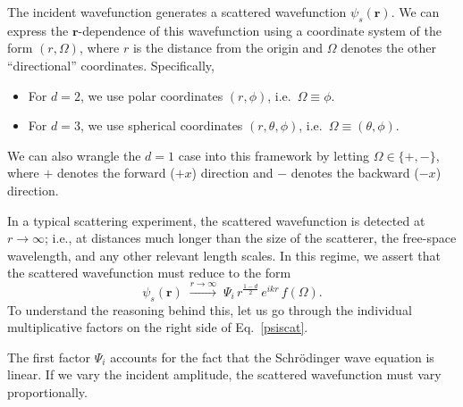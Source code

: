 \documentclass[prx,12pt]{revtex4-2}
\begin{document}
The incident wavefunction generates a scattered wavefunction
$\psi_s(\mathbf{r})$.  We can express the $\mathbf{r}$-dependence of
this wavefunction using a coordinate system of the form $(r,\Omega)$,
where $r$ is the distance from the origin and $\Omega$ denotes the
other ``directional'' coordinates.  Specifically,
\begin{itemize}
\item For $d = 2$, we use polar coordinates $(r,\phi)$, i.e.~$\Omega
  \equiv \phi$.

\item For $d = 3$, we use spherical coordinates $(r, \theta, \phi)$,
  i.e.~$\Omega \equiv (\theta,\phi)$.
\end{itemize}
We can also wrangle the $d = 1$ case into this framework by letting
$\Omega \in \{+, -\}$, where $+$ denotes the forward ($+x$) direction
and $-$ denotes the backward ($-x$) direction.

In a typical scattering experiment, the scattered wavefunction is
detected at $r \rightarrow \infty$; i.e., at distances much longer
than the size of the scatterer, the free-space wavelength, and any
other relevant length scales.  In this regime, we assert that the
scattered wavefunction must reduce to the form
\begin{equation}
  \psi_s(\mathbf{r})\;  \overset{r\rightarrow\infty}{\longrightarrow}\; \Psi_i \, r^{\frac{1-d}{2}} \, e^{ikr} \, f(\Omega).
  \label{psiscat}
\end{equation}
To understand the reasoning behind this, let us go through the
individual multiplicative factors on the right side of
Eq.~\eqref{psiscat}.

The first factor $\Psi_i$ accounts for the fact that the Schr\"odinger
wave equation is linear.  If we vary the incident amplitude, the
scattered wavefunction must vary proportionally.
\end{document}
